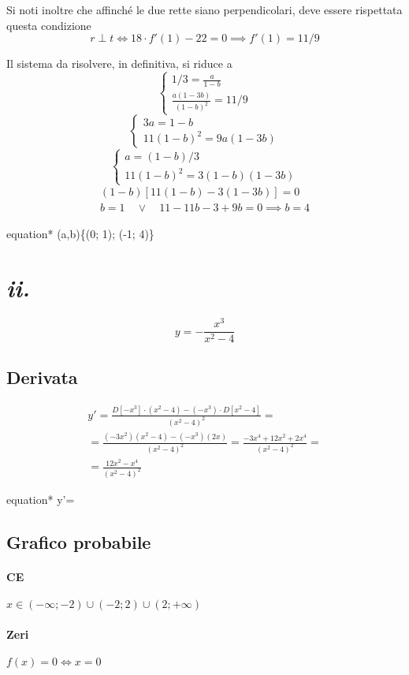 \documentclass[a4paper, oneside]{article}
\newcommand*\mygraybox[0]{%
		\tcbhighmath}
\newcommand{\equazione}[1]{	\begin{empheq}[box=\mygraybox]{equation*}
			#1
		\end{empheq}}
\newcounter{i}%
\newcounter{n}%
\newcounter{I}%
\begin{document}
	Si noti inoltre che affinché le due rette siano perpendicolari, deve essere rispettata questa condizione
	\[
		r\perp t \iff 18\cdot f'(1)-22=0\implies f'(1)=11/9
	\]
	
	Il sistema da risolvere, in definitiva, si riduce a
	\[
	\begin{cases}
		\displaystyle1/3=\frac{a}{1-b}\\
		\displaystyle\frac{a(1-3b)}{(1-b)^2}=11/9
	\end{cases}
	\]
	\[
	\begin{cases}
		3a=1-b\\
		11(1-b)^2=9a(1-3b)
	\end{cases}
	\]
	\[
	\begin{cases}
		a=(1-b)/3\\
		11(1-b)^2=3(1-b)(1-3b)
	\end{cases}
	\]
	\begin{gather*}
	(1-b)[11(1-b)-3(1-3b)]=0\\
	b=1\quad\lor\quad11-11b-3+9b=0\implies b=4
	\end{gather*}

	\equazione{(a,b)\in\{(0; 1); (-1; 4)\}}
	
	\section*{\textit{ii.}}
	\[
	y=-\frac{x^3}{x^2-4}
	\]
	\subsection*{Derivata}
	\begin{multline*}
		y'=\frac{D[-x^3]\cdot(x^2-4)-(-x^3)\cdot D[x^2-4]}{(x^2-4)^2}=\\
		=\frac{(-3x^2)(x^2-4)-(-x^3)(2x)}{(x^2-4)^2}=\frac{-3x^4+12x^2+2x^4}{(x^2-4)^2}=\\
		=
	\end{multline*}
	\equazione{y'=\frac{12x^2-x^4}{(x^2-4)^2}}
	\subsection*{Grafico probabile}
	\paragraph{CE} $\displaystyle	x\in (-\infty;-2)\cup(-2;2)\cup(2;+\infty)$
	\paragraph{Zeri} $\displaystyle f(x)=0\iff x=0$
\end{document}
